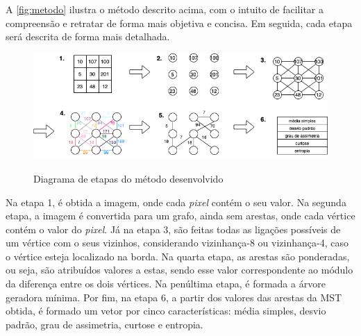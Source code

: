 \par A \autoref{fig:metodo} ilustra o método descrito acima, com o intuito de facilitar a compreensão e retratar de forma mais objetiva e concisa. Em seguida, cada etapa será descrita de forma mais detalhada.

\begin{figure}[h]
    \centering
    \caption{Diagrama de etapas do método desenvolvido}
    \includegraphics[width=1\textwidth]{./dados/figuras/metodo.png}
    \label{fig:metodo}
\end{figure}

\par Na etapa 1, é obtida a imagem, onde cada \textit{pixel} contém o seu valor. Na segunda etapa, a imagem é convertida para um grafo, ainda sem arestas, onde cada vértice contém o valor do \textit{pixel}. Já na etapa 3, são feitas todas as ligações possíveis de um vértice com o seus vizinhos, considerando vizinhança-8 ou vizinhança-4, caso o vértice esteja localizado na borda. Na quarta etapa, as arestas são ponderadas, ou seja, são atribuídos valores a estas, sendo esse valor correspondente ao módulo da diferença entre os dois vértices. Na penúltima etapa, é formada a árvore geradora mínima. Por fim, na etapa 6, a partir dos valores das arestas da MST obtida, é formado um vetor por cinco características: média simples, desvio padrão, grau de assimetria, curtose e entropia.

